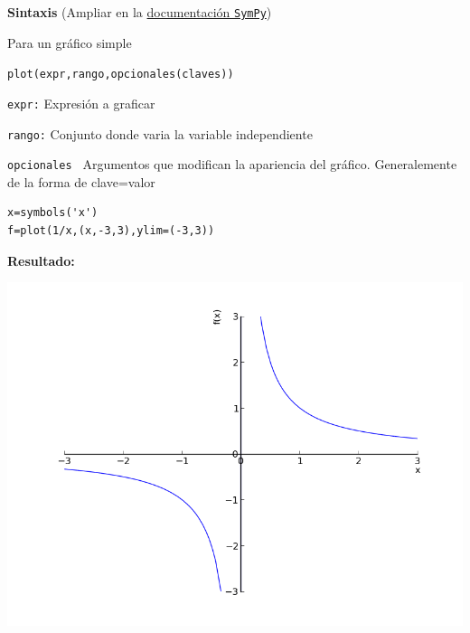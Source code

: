 \begin{codigo}

\textbf{Sintaxis} (Ampliar en la \href{http://docs.sympy.org/latest/modules/plotting.html}{documentación \texttt{SymPy}})\link

Para un gráfico simple

\texttt{plot(expr,rango,opcionales(claves))}

\texttt{expr:} Expresión a graficar 

\texttt{rango:} Conjunto donde varia la variable independiente 

\texttt{opcionales } Argumentos que modifican la apariencia del gráfico. Generalemente de la forma de clave=valor

\end{codigo}


\begin{ejemplo}

\end{ejemplo}


\begin{lstlisting}
x=symbols('x')
f=plot(1/x,(x,-3,3),ylim=(-3,3))
\end{lstlisting}

\noindent\textbf{Resultado:}
\begin{center}
\includegraphics[scale=.35]{imagenes/ejemplo_plot.png}
\end{center}












